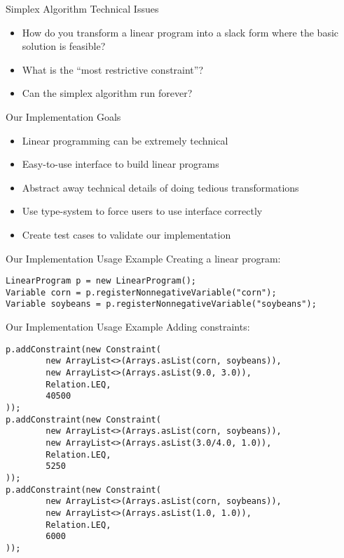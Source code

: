 \documentclass{beamer}
\begin{document}
\begin{frame}{Simplex Algorithm Technical Issues}
    \begin{itemize}
        \item<1-> How do you transform a linear program into a slack form where the basic solution is feasible?
        \item<2-> What is the ``most restrictive constraint''?
        \item<3-> Can the simplex algorithm run forever?
    \end{itemize} 
\end{frame}

\begin{frame}[fragile]{Our Implementation Goals}
    \begin{itemize}
        \item<1-> Linear programming can be extremely technical
        \item<2-> Easy-to-use interface to build linear programs
        \item<3-> Abstract away technical details of doing tedious transformations
        \item<4-> Use type-system to force users to use interface correctly
        \item<5-> Create test cases to validate our implementation
    \end{itemize} 
\end{frame}

\begin{frame}[fragile]{Our Implementation Usage Example}
    Creating a linear program:
    
    \begin{verbatim}
LinearProgram p = new LinearProgram();
Variable corn = p.registerNonnegativeVariable("corn");
Variable soybeans = p.registerNonnegativeVariable("soybeans");
    \end{verbatim}
\end{frame}

\begin{frame}[fragile]{Our Implementation Usage Example}
    Adding constraints:
    \begin{verbatim}
p.addConstraint(new Constraint(
        new ArrayList<>(Arrays.asList(corn, soybeans)),
        new ArrayList<>(Arrays.asList(9.0, 3.0)),
        Relation.LEQ,
        40500
));
p.addConstraint(new Constraint(
        new ArrayList<>(Arrays.asList(corn, soybeans)),
        new ArrayList<>(Arrays.asList(3.0/4.0, 1.0)),
        Relation.LEQ,
        5250
));
p.addConstraint(new Constraint(
        new ArrayList<>(Arrays.asList(corn, soybeans)),
        new ArrayList<>(Arrays.asList(1.0, 1.0)),
        Relation.LEQ,
        6000
));
    \end{verbatim}
\end{frame}
\end{document}
